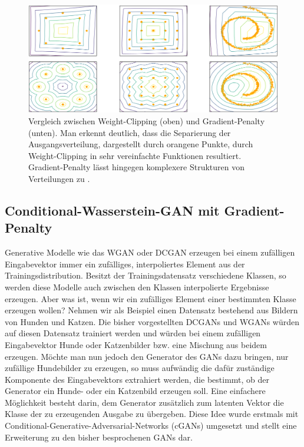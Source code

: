 \begin{figure}
\centering
\includegraphics[width=\textwidth]{images/problems_of_weight_clipping}
\caption{Vergleich zwischen Weight-Clipping (oben) und Gradient-Penalty
(unten). Man erkennt deutlich, dass die Separierung der Ausgangsverteilung,
dargestellt durch orangene Punkte, durch Weight-Clipping in sehr
vereinfachte Funktionen resultiert. Gradient-Penalty lässt hingegen
komplexere Strukturen von Verteilungen zu \cite{gulrajani2017improved}.}
\label{fig:problems-of-weight-clipping}
\end{figure}

\subsection{Conditional-Wasserstein-GAN mit Gradient-Penalty}\label{section:cwgan-gp}
Generative Modelle wie das WGAN oder DCGAN erzeugen bei einem zufälligen
Eingabevektor immer ein zufälliges, interpoliertes Element aus der
Trainingsdistribution. Besitzt der Trainingsdatensatz verschiedene Klassen, so
werden diese Modelle auch zwischen den Klassen interpolierte Ergebnisse
erzeugen. Aber was ist, wenn wir ein zufälliges Element einer bestimmten Klasse
erzeugen wollen? Nehmen wir als Beispiel einen Datensatz bestehend aus Bildern
von Hunden und Katzen. Die bisher vorgestellten DCGANs und WGANs würden auf
diesen Datensatz trainiert werden und würden bei einem zufälligen Eingabevektor
Hunde oder Katzenbilder bzw. eine Mischung aus beidem erzeugen. Möchte man nun
jedoch den Generator des GANs dazu bringen, nur zufällige Hundebilder zu
erzeugen, so muss aufwändig die dafür zuständige Komponente des Eingabevektors
extrahiert werden, die bestimmt, ob der Generator ein Hunde- oder ein Katzenbild
erzeugen soll. Eine einfachere Möglichkeit besteht darin, dem Generator
zusätzlich zum latenten Vektor die Klasse der zu erzeugenden Ausgabe zu
übergeben. Diese Idee wurde erstmals mit
Conditional-Generative-Adversarial-Networks (cGANs) \cite{mirza2014conditional}
umgesetzt und stellt eine Erweiterung zu den bisher besprochenen GANs dar.

